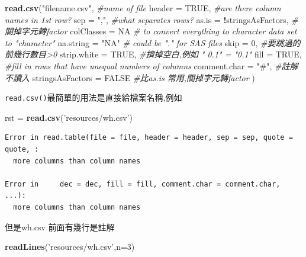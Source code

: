 \documentclass[]{book}
\newenvironment{Shaded}{\begin{snugshade}}{\end{snugshade}}
\newcommand{\CommentTok}[1]{\textcolor[rgb]{0.56,0.35,0.01}{\textit{#1}}}
\newcommand{\DataTypeTok}[1]{\textcolor[rgb]{0.13,0.29,0.53}{#1}}
\newcommand{\DecValTok}[1]{\textcolor[rgb]{0.00,0.00,0.81}{#1}}
\newcommand{\KeywordTok}[1]{\textcolor[rgb]{0.13,0.29,0.53}{\textbf{#1}}}
\newcommand{\NormalTok}[1]{#1}
\newcommand{\OperatorTok}[1]{\textcolor[rgb]{0.81,0.36,0.00}{\textbf{#1}}}
\newcommand{\OtherTok}[1]{\textcolor[rgb]{0.56,0.35,0.01}{#1}}
\newcommand{\StringTok}[1]{\textcolor[rgb]{0.31,0.60,0.02}{#1}}
\theoremstyle{definition}
\theoremstyle{definition}
\theoremstyle{definition}
\theoremstyle{remark}
\begin{document}
\begin{Shaded}
\begin{Highlighting}[]
\KeywordTok{read.csv}\NormalTok{(}\StringTok{"filename.csv"}\NormalTok{, }\CommentTok{#name of file}
         \DataTypeTok{header =} \OtherTok{TRUE}\NormalTok{, }\CommentTok{#are there column names in 1st row?}
         \DataTypeTok{sep =} \StringTok{","}\NormalTok{, }\CommentTok{#what separates rows?}
         \DataTypeTok{as.is =} \OperatorTok{!}\NormalTok{stringsAsFactors, }\CommentTok{#關掉字元轉factor}
         \DataTypeTok{colClasses =} \OtherTok{NA} \CommentTok{# to convert everything to character data set to "character"}
         \DataTypeTok{na.string =} \StringTok{"NA"} \CommentTok{# could be "." for SAS files}
         \DataTypeTok{skip =} \DecValTok{0}\NormalTok{, }\CommentTok{#要跳過的前幾行數目>0}
         \DataTypeTok{strip.white =} \OtherTok{TRUE}\NormalTok{, }\CommentTok{#擠掉空白,例如 " 0.1" = "0.1"}
         \DataTypeTok{fill =} \OtherTok{TRUE}\NormalTok{, }\CommentTok{#fill in rows that have unequal numbers of columns}
         \DataTypeTok{comment.char =} \StringTok{"#"}\NormalTok{, }\CommentTok{#註解不讀入}
         \DataTypeTok{stringsAsFactors =} \OtherTok{FALSE} \CommentTok{#比as.is 常用,關掉字元轉factor}
\NormalTok{         )}
\end{Highlighting}
\end{Shaded}

\texttt{read.csv()}最簡單的用法是直接給檔案名稱,例如

\begin{Shaded}
\begin{Highlighting}[]
\NormalTok{rst =}\StringTok{ }\KeywordTok{read.csv}\NormalTok{(}\StringTok{'resources/wh.csv'}\NormalTok{)}
\end{Highlighting}
\end{Shaded}

\begin{verbatim}
Error in read.table(file = file, header = header, sep = sep, quote = quote, :
  more columns than column names

Error in     dec = dec, fill = fill, comment.char = comment.char, ...):
  more columns than column names
\end{verbatim}

但是wh.csv 前面有幾行是註解

\begin{Shaded}
\begin{Highlighting}[]
\KeywordTok{readLines}\NormalTok{(}\StringTok{'resources/wh.csv'}\NormalTok{,}\DataTypeTok{n=}\DecValTok{3}\NormalTok{)}
\end{Highlighting}
\end{Shaded}
\end{document}
